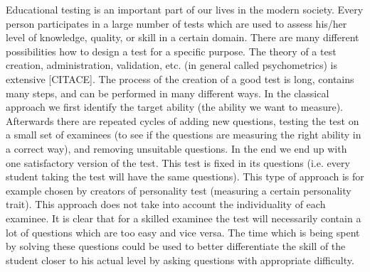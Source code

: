 Educational testing is an important part of our lives in the modern society. Every person participates in a large number of tests which are used to assess his/her level of knowledge, quality, or skill in a certain domain. There are many different possibilities how to design a test for a specific purpose. The theory of a test creation, administration, validation, etc. (in general called psychometrics) is extensive [CITACE]. The process of the creation of a good test is long, contains many steps, and can be performed in many different ways. In the classical approach we first identify the target ability (the ability we want to measure). Afterwards there are repeated cycles of adding new questions, testing the test on a small set of examinees (to see if the questions are measuring the right ability in a correct way), and removing unsuitable questions. In the end we end up with one satisfactory version of the test. This test is fixed in its questions (i.e. every student taking the test will have the same questions). This type of approach is for example chosen by creators of personality test (measuring a certain personality trait). This approach does not take into account the individuality of each examinee. It is clear that for a skilled examinee the test will necessarily contain a lot of questions which are too easy and vice versa. The time which is being spent by solving these questions could be used to better differentiate the skill of the student closer to his actual level by asking questions with appropriate difficulty.
 
